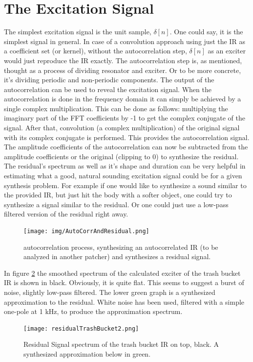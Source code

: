 \section{The Excitation Signal}
\label{subsec:exciter}
The simplest excitation signal is the unit sample, \(\delta[n]\). One could say, it is the simplest signal in general. In case of a convolution approach using just the IR as a coefficient set (or kernel), without the autocorrelation step, \(\delta[n]\) as an exciter would just reproduce the IR exactly. The autocorrelation step is, as mentioned, thought as a process of dividing resonator and exciter. Or to be more concrete, it's dividing periodic and non-periodic components. The output of the autocorrelation can be used to reveal the excitation signal. When the autocorrelation is done in the frequency domain it can simply be achieved by a single complex multiplication. This can be done as follows: multiplying the imaginary part of the FFT coefficients by -1 to get the complex conjugate of the signal. After that, convolution (a complex multiplication) of the original signal with its complex conjugate is performed. This provides the autocorrelation signal. The amplitude coefficients of the autocorrelation can now be subtracted from the amplitude coefficients or the original (clipping to 0) to synthesize the residual. The residual's spectrum as well as it's shape and duration can be very helpful in estimating what a good, natural sounding excitation signal could be for a given synthesis problem. For example if one would like to synthesize a sound similar to the provided IR, but just hit the body with a softer object, one could try to synthesize a signal similar to the residual. Or one could just use a low-pass filtered version of the residual right away.

    \begin{figure}[h]
    	\begin{center}
    		\texttt{[image: img/AutoCorrAndResidual.png]}
    		\caption{autocorrelation process, synthesizing an autocorrelated IR (to be analyzed in another patcher) and synthesizes a residual signal.}
    		\label{fig:acAndResidual}
    	\end{center}
    \end{figure}
In figure \ref{fig:residual} the smoothed spectrum of the calculated exciter of the trash bucket IR is shown in black. Obviously, it is quite flat. This seems to suggest a burst of noise, slightly low-pass filtered. The lower green graph is a synthesized approximation to the residual. White noise has been used, filtered with a simple one-pole at 1 kHz, to produce the approximation spectrum.


\begin{figure}[h]
	\begin{center}
		\texttt{[image: residualTrashBucket2.png]}
		\caption{Residual Signal spectrum of the trash bucket IR on top, black. A synthesized approximation below in green.}
		\label{fig:residual}
	\end{center}
\end{figure}






    
    









